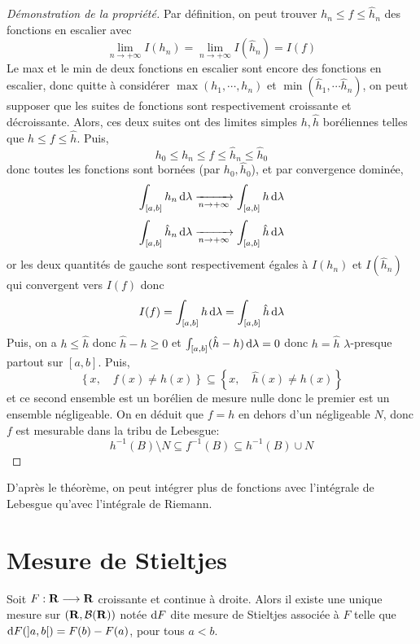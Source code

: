\begin{proof}[Démonstration de la propriété]
Par définition, on peut trouver $h_n \leq f\leq \hat{h}_n$ des fonctions en escalier avec \[
    \lim_{n\to +\infty} I(h_n)=\lim_{n\to +\infty} I(\hat{h}_n)=I(f)
\] 
Le max et le min de deux fonctions en escalier sont encore des fonctions en escalier, donc quitte à considérer $\max(h_1, \cdots , h_n)$ et $\min (\hat{h}_1, \cdots \hat{h}_n)$, on peut supposer que les suites de fonctions sont respectivement croissante et décroissante. Alors, ces deux suites ont des limites simples $h, \hat{h}$ boréliennes telles que $h\leq f\leq \hat{h}$. Puis, \[
h_0\leq h_n\leq f\leq \hat{h}_n\leq \hat{h}_0
\] 
donc toutes les fonctions sont bornées (par $h_0, \hat{h}_0$), et par convergence dominée, \[
    \int_{[a, b]}h_n\mathop{}\!\mathrm d \lambda \xrightarrow[n\to+\infty]{}\int_{[a, b]}h\mathop{}\!\mathrm d \lambda
\]
\[
    \int_{[a, b]}\hat{h}_n\mathop{}\!\mathrm d \lambda \xrightarrow[n\to+\infty]{}\int_{[a, b]}\hat{h}\mathop{}\!\mathrm d \lambda
\] 
or les deux quantités de gauche sont respectivement égales à  $I(h_n)$ et  $I(\hat{h}_n)$ qui convergent vers $I(f)$ donc  \[
    I(f)= \int_{[a,b]} h\mathop{}\!\mathrm d \lambda=\int_{[a, b]}\hat{h}\mathop{}\!\mathrm d \lambda
\]
Puis, on a $h\leq \hat{h}$ donc $\hat{h}-h\geq 0$ et $\int_{[a, b]}(\hat{h}-h)\mathop{}\!\mathrm d \lambda=0$ donc $h=\hat{h}$ $\lambda$-presque partout sur $[a, b]$. Puis, \[ \left\{ x , \quad  f(x)\neq h(x) \right\} \subseteq \left\{ x, \quad  \hat{h}(x) \neq  h(x) \right\} \] et ce second ensemble est un borélien de mesure nulle donc le premier est un ensemble négligeable. On en déduit que $f=h$ en dehors d'un négligeable  $N$, donc  $f$ est mesurable dans la tribu de Lebesgue:  \[
h^{-1}(B)\setminus  N \subseteq f^{-1} (B) \subseteq h^{-1}(B)\cup N
\] 
\end{proof}

\begin{rem}
D'après le théorème, on peut intégrer plus de fonctions avec l'intégrale de Lebesgue qu'avec l'intégrale de Riemann.
\end{rem}

\section{Mesure de Stieltjes}

\begin{prop}
    Soit $F: \mathbf R \longrightarrow \mathbf R$ croissante et continue à droite. Alors il existe une unique mesure sur $(\mathbf R, \mathcal  B(\mathbf R))$ notée $\mathop{}\!\mathrm d F$ dite mesure de Stieltjes associée à  $F$ telle que  $\mathop{}\!\mathrm d F(]a, b[)=F(b)-F(a)$, pour tous  $a<b$.
\end{prop}

